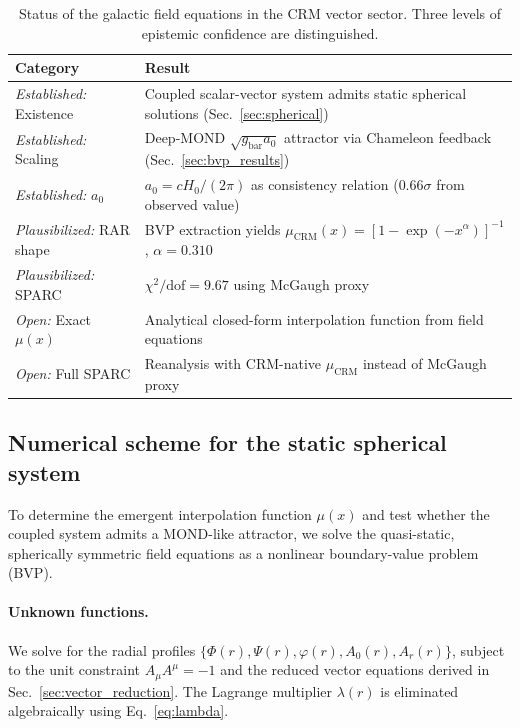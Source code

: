 \documentclass[aps,prd,twocolumn,superscriptaddress,nofootinbib]{revtex4-2}
\begin{document}
\begin{table}[tbp]
\caption{\label{tab:galactic_status}Status of the galactic field equations in the CRM vector sector. Three levels of epistemic confidence are distinguished.}
\begin{ruledtabular}
\begin{tabular}{ll}
\textbf{Category} & \textbf{Result} \\
\hline
\textit{Established:} Existence & Coupled scalar-vector system admits static spherical solutions (Sec.~\ref{sec:spherical}) \\
\textit{Established:} Scaling & Deep-MOND $\sqrt{g_{\mathrm{bar}} a_0}$ attractor via Chameleon feedback (Sec.~\ref{sec:bvp_results}) \\
\textit{Established:} $a_0$ & $a_0 = cH_0/(2\pi)$ as consistency relation ($0.66\sigma$ from observed value) \\
\hline
\textit{Plausibilized:} RAR shape & BVP extraction yields $\mu_{\mathrm{CRM}}(x) = [1-\exp(-x^\alpha)]^{-1}$, $\alpha = 0.310$ \\
\textit{Plausibilized:} SPARC & $\chi^2/\mathrm{dof} = 9.67$ using McGaugh proxy \\
\hline
\textit{Open:} Exact $\mu(x)$ & Analytical closed-form interpolation function from field equations \\
\textit{Open:} Full SPARC & Reanalysis with CRM-native $\mu_{\mathrm{CRM}}$ instead of McGaugh proxy \\
\end{tabular}
\end{ruledtabular}
\end{table}

\subsection{Numerical scheme for the static spherical system}
\label{sec:numerical_scheme}

To determine the emergent interpolation function $\mu(x)$ and test whether the coupled system admits a MOND-like attractor, we solve the quasi-static, spherically symmetric field equations as a nonlinear boundary-value problem (BVP).

\paragraph{Unknown functions.}
We solve for the radial profiles $\{\Phi(r), \Psi(r), \varphi(r), A_0(r), A_r(r)\}$, subject to the unit constraint $A_\mu A^\mu = -1$ and the reduced vector equations derived in Sec.~\ref{sec:vector_reduction}. The Lagrange multiplier $\lambda(r)$ is eliminated algebraically using Eq.~\eqref{eq:lambda}.
\end{document}
